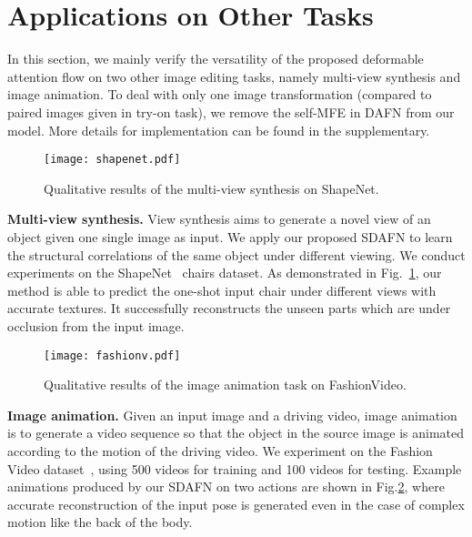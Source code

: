 \documentclass[runningheads]{llncs}
\begin{document}
\section{Applications on Other Tasks}
In this section, we mainly verify the versatility of the proposed deformable attention flow on two other image editing tasks, namely multi-view synthesis and image animation. To deal with only one image transformation (compared to paired images given in try-on task), we remove the self-MFE in DAFN  from our model. More details for implementation can be found in the supplementary.

\begin{figure}[t]
\centering
\texttt{[image: shapenet.pdf]}

   \caption{Qualitative results of the multi-view synthesis on ShapeNet.\label{shape}}

\end{figure}

\textbf{Multi-view synthesis.}
View synthesis aims to generate a novel view of an object given one single image as input. We apply our proposed SDAFN to learn the structural correlations of the same object under different viewing. We conduct experiments on the ShapeNet~\cite{chang2015shapenet} chairs dataset. As demonstrated in Fig.~\ref{shape}, our method is able to predict the one-shot input chair under different views with accurate textures. It successfully reconstructs the unseen parts which are under occlusion from the input image.


\begin{figure}[t]
\centering
\texttt{[image: fashionv.pdf]}

   \caption{Qualitative results of the image animation task on FashionVideo.\label{fashionv}}

\end{figure}

\textbf{Image animation.}
Given an input image and a driving video, image animation is to generate a video sequence so that the object in the source image is animated according to the motion of the driving video. We experiment on the Fashion Video dataset~\cite{zablotskaia2019dwnet}, using 500 videos for training and 100 videos for testing. Example animations produced by our SDAFN on two actions are shown in Fig.\ref{fashionv}, where accurate reconstruction of the input pose is generated even in the case of complex motion like the back of the body.
\end{document}
